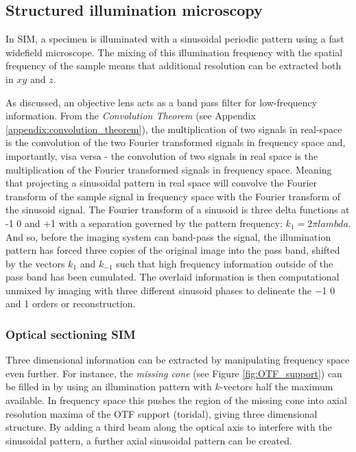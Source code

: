 \subsection{Structured illumination microscopy}

In SIM, a specimen is illuminated with a sinusoidal periodic pattern using a fast widefield microscope.
The mixing of this illumination frequency with the spatial frequency of the sample means that additional resolution can be extracted both in $xy$ and $z$.

As discussed, an objective lens acts as a band pass filter for low-frequency information.
From the \emph{Convolution Theorem} (see Appendix \ref{appendix:convolution_theorem}), the multiplication of two signals in real-space is the convolution of the two Fourier transformed signals in frequency space and, importantly, visa versa -
the convolution of two signals in real space is the multiplication of the Fourier transformed signals in frequency space.
Meaning that projecting a sinusoidal pattern in real space will convolve the Fourier transform of the sample signal in frequency space with the Fourier transform of the sinusoid signal.
The Fourier transform of a sinusoid is three delta functions at -1 0 and +1 with a separation governed by the pattern frequency: $k_1 = {2\pi}{lambda}$.
And so, before the imaging system can band-pass the signal, the illumination pattern has forced three copies of the original image into the pass band, shifted by the vectors $k_1$ and $k_{-1}$ such that high frequency information outside of the pass band has been cumulated.
The overlaid information is then computational unmixed by imaging with three different sinusoid phases to delineate the \SI{-1}{} \SI{0}{} and \SI{+1}{} orders or reconstruction.

\subsubsection{Optical sectioning SIM}

Three dimensional information can be extracted by manipulating frequency space even further.
For instance, the \emph{missing cone} (see Figure \ref{fig:OTF_support}) can be filled in by using an illumination pattern with $k$-vectors half the maximum available.
In frequency space this pushes the region of the missing cone into axial resolution maxima of the OTF support (toridal), giving three dimensional structure.
By adding a third beam along the optical axis to interfere with the sinusoidal pattern, a further axial sinusoidal pattern can be created.

